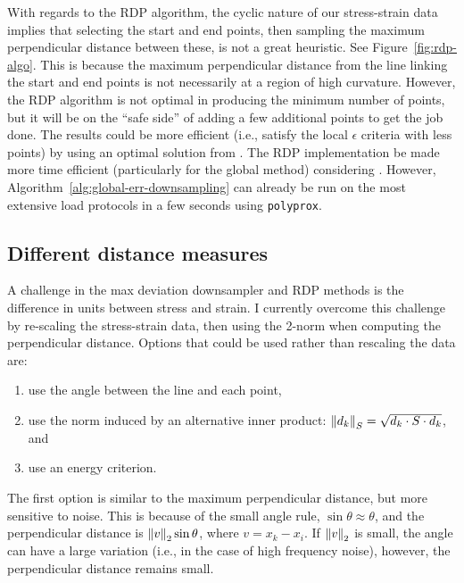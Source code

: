 \documentclass[a4paper,11pt]{article}
\begin{document}
With regards to the RDP algorithm, the cyclic nature of our stress-strain data implies that selecting the start and end points, then sampling the maximum perpendicular distance between these, is not a great heuristic.
See Figure~\ref{fig:rdp-algo}.
This is because the maximum perpendicular distance from the line linking the start and end points is not necessarily at a region of high curvature.
However, the RDP algorithm is not optimal in producing the minimum number of points, but it will be on the ``safe side'' of adding a few additional points to get the job done.
The results could be more efficient (i.e., satisfy the local $\epsilon$ criteria with less points) by using an optimal solution from \citet{ChanApproximationPolygonalCurves1996}.
The RDP implementation be made more time efficient (particularly for the global method) considering \citet{HershbergerSpeedingDouglasPeuckerLineSimpli1992}.
However, Algorithm~\ref{alg:global-err-downsampling} can already be run on the most extensive load protocols in a few seconds using \texttt{polyprox}.

\subsection{Different distance measures}

A challenge in the max deviation downsampler and RDP methods is the difference in units between stress and strain.
I currently overcome this challenge by re-scaling the stress-strain data, then using the 2-norm when computing the perpendicular distance.
Options that could be used rather than rescaling the data are:
\begin{enumerate}
    \item use the angle between the line and each point,
    \item use the norm induced by an alternative inner product: $\norm{d_k}_S = \sqrt{d_k \cdot S \cdot d_k}$, and
    \item use an energy criterion.
\end{enumerate}

The first option is similar to the maximum perpendicular distance, but more sensitive to noise.
This is because of the small angle rule, $\sin \theta \approx \theta$, and the perpendicular distance is $\norm{v}_2 \sin \theta$, where $v = x_k - x_i$.
If $\norm{v}_2$ is small, the angle can have a large variation (i.e., in the case of high frequency noise), however, the perpendicular distance remains small.
\end{document}
